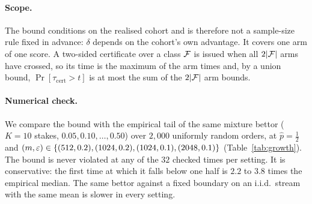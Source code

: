 \paragraph{Scope.} The bound conditions on the realised cohort and is therefore not a
sample-size rule fixed in advance: $\delta$ depends on the cohort's own advantage. It
covers one arm of one score. A two-sided certificate over a class $\mathcal{F}$ is issued when
all $2|\mathcal{F}|$ arms have crossed, so its time is the maximum of the arm times and, by a
union bound, $\Pr[\tau_{\mathrm{cert}}>t]$ is at most the sum of the $2|\mathcal{F}|$ arm
bounds.

\paragraph{Numerical check.} We compare the bound with the empirical tail of the same
mixture bettor ($K=10$ stakes, $0.05,0.10,\dots,0.50$) over $2{,}000$ uniformly random orders, at $\hat p=\frac12$
and $(m,\varepsilon)\in\{(512,0.2),(1024,0.2),(1024,0.1),(2048,0.1)\}$
(Table~\ref{tab:growth}). The bound is never violated at any of the $32$ checked times
per setting. It is conservative: the first time at which it falls below one half is
$2.2$ to $3.8$ times the empirical median. The same bettor against a fixed boundary on
an i.i.d.\ stream with the same mean is slower in every setting.

\begin{table}[t]
\centering\small
\caption{Certification time of the upper arm, $\hat p=\frac12$, $\alpha=0.05$,
$2{,}000$ uniformly random reveal orders per setting. ``Bound $\le\frac12$'' is the first
checked time at which Theorem~\ref{thm:growth} bounds $\Pr[\tau>t]$ by one half;
``fixed boundary'' is the same bettor on an i.i.d.\ stream with the same mean.}
\label{tab:growth}

\end{table}
